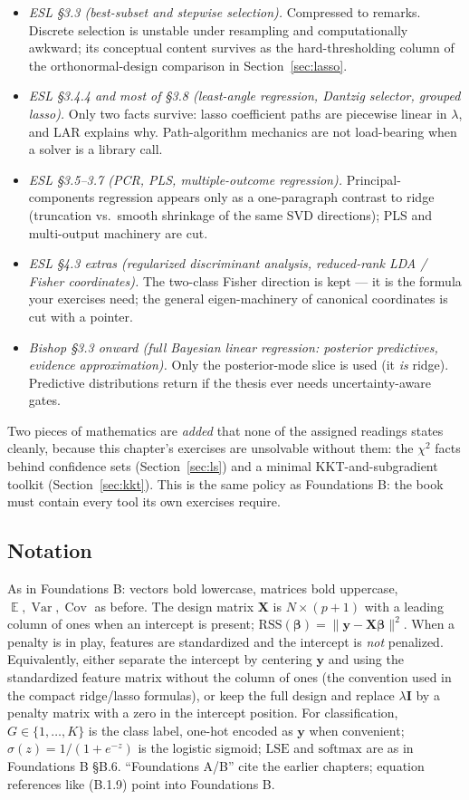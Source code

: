 \documentclass[11pt]{article}
\numberwithin{equation}{section}
\theoremstyle{plain}
\theoremstyle{definition}
\theoremstyle{remark}
\newcounter{exercise}
\DeclareMathOperator{\E}{\mathbb{E}}
\DeclareMathOperator{\Var}{Var}
\DeclareMathOperator{\Cov}{Cov}
\newcommand{\X}{\bm{X}}
\newcommand{\y}{\bm{y}}
\newcommand{\bbeta}{\bm{\beta}}
\newcommand{\RSS}{\mathrm{RSS}}
\begin{document}
\begin{itemize}[leftmargin=2em,itemsep=0.15em]
\item \emph{ESL \S3.3 (best-subset and stepwise selection).} Compressed to remarks. Discrete selection is unstable under resampling and computationally awkward; its conceptual content survives as the hard-thresholding column of the orthonormal-design comparison in Section~\ref{sec:lasso}.
\item \emph{ESL \S3.4.4 and most of \S3.8 (least-angle regression, Dantzig selector, grouped lasso).} Only two facts survive: lasso coefficient paths are piecewise linear in $\lambda$, and LAR explains why. Path-algorithm mechanics are not load-bearing when a solver is a library call.
\item \emph{ESL \S3.5--3.7 (PCR, PLS, multiple-outcome regression).} Principal-components regression appears only as a one-paragraph contrast to ridge (truncation vs.\ smooth shrinkage of the same SVD directions); PLS and multi-output machinery are cut.
\item \emph{ESL \S4.3 extras (regularized discriminant analysis, reduced-rank LDA / Fisher coordinates).} The two-class Fisher direction is kept --- it is the formula your exercises need; the general eigen-machinery of canonical coordinates is cut with a pointer.
\item \emph{Bishop \S3.3 onward (full Bayesian linear regression: posterior predictives, evidence approximation).} Only the posterior-mode slice is used (it \emph{is} ridge). Predictive distributions return if the thesis ever needs uncertainty-aware gates.
\end{itemize}

Two pieces of mathematics are \emph{added} that none of the assigned readings states cleanly, because this chapter's exercises are unsolvable without them: the $\chi^2$ facts behind confidence sets (Section~\ref{sec:ls}) and a minimal KKT-and-subgradient toolkit (Section~\ref{sec:kkt}). This is the same policy as Foundations B: the book must contain every tool its own exercises require.

\subsection*{Notation}

As in Foundations B: vectors bold lowercase, matrices bold uppercase, $\E, \Var, \Cov$ as before. The design matrix $\X$ is $N \times (p+1)$ with a leading column of ones when an intercept is present; $\RSS(\bbeta) = \|\y - \X\bbeta\|^2$. When a penalty is in play, features are standardized and the intercept is \emph{not} penalized. Equivalently, either separate the intercept by centering $\y$ and using the standardized feature matrix without the column of ones (the convention used in the compact ridge/lasso formulas), or keep the full design and replace $\lambda\bm I$ by a penalty matrix with a zero in the intercept position. For classification, $G \in \{1, \dots, K\}$ is the class label, one-hot encoded as $\y$ when convenient; $\sigma(z) = 1/(1+e^{-z})$ is the logistic sigmoid; $\mathrm{LSE}$ and $\mathrm{softmax}$ are as in Foundations B \S B.6. ``Foundations A/B'' cite the earlier chapters; equation references like (B.1.9) point into Foundations B.
\end{document}
